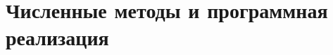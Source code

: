 \documentclass[12pt, a4paper]{article}
\begin{document}


\newpage
\section{Численные методы и программная реализация}
\end{document}
